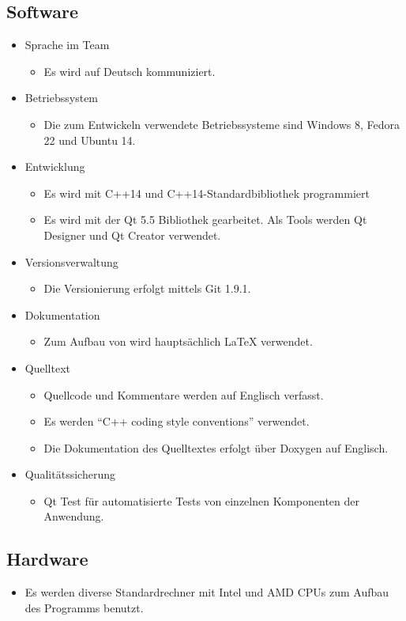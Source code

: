 \subsection{Software}
\begin{itemize}
\item Sprache im Team
	\begin{itemize}[label={--}]
		\item Es wird auf Deutsch kommuniziert.
	\end{itemize}
\item Betriebssystem
	\begin{itemize}[label={--}]
		\item Die zum Entwickeln verwendete Betriebssysteme sind Windows 8, Fedora 22 und Ubuntu 14.
	\end{itemize}
\item Entwicklung
	\begin{itemize}[label={--}]
		\item Es wird mit C++14 und C++14-Standardbibliothek programmiert
		\item Es wird mit der \gls{Qt} 5.5 Bibliothek gearbeitet. Als Tools werden \gls{Qt Designer} und \gls{Qt Creator} verwendet.
	\end{itemize}
\item \gls{Versionsverwaltung}
	\begin{itemize}[label={--}]
		\item Die Versionierung erfolgt mittels \gls{Git} 1.9.1.
	\end{itemize}
\item Dokumentation
	\begin{itemize}[label={--}]
		\item Zum Aufbau von  wird hauptsächlich LaTeX verwendet.
	\end{itemize}
\item Quelltext
	\begin{itemize}[label={--}]
		\item Quellcode und Kommentare werden auf Englisch verfasst.
		\item Es werden \enquote{C++ coding style conventions} verwendet.
		\item Die Dokumentation des Quelltextes erfolgt über \gls{Doxygen} auf Englisch.
	\end{itemize}
\item Qualitätssicherung
	\begin{itemize}[label={--}]
		\item \gls{Qt Test} für automatisierte Tests von einzelnen Komponenten der Anwendung.
	\end{itemize}

\end{itemize}

\subsection{Hardware}
\begin{itemize}
	\item Es werden diverse Standardrechner mit Intel und AMD CPUs zum Aufbau des Programms benutzt.
\end{itemize}
\pagebreak
